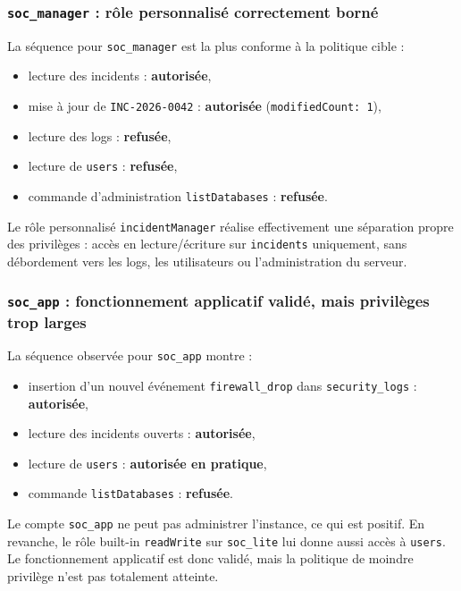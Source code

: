 \documentclass[11pt,a4paper]{article}
\begin{document}
\subsubsection{\texttt{soc\_manager} : rôle personnalisé correctement borné}

La séquence pour \texttt{soc\_manager} est la plus conforme à la politique cible :
\begin{itemize}
  \item lecture des incidents : \textbf{autorisée},
  \item mise à jour de \texttt{INC-2026-0042} : \textbf{autorisée} (\texttt{modifiedCount: 1}),
  \item lecture des logs : \textbf{refusée},
  \item lecture de \texttt{users} : \textbf{refusée},
  \item commande d'administration \texttt{listDatabases} : \textbf{refusée}.
\end{itemize}

\begin{resultbox}[Évaluation]
Le rôle personnalisé \texttt{incidentManager} réalise effectivement une séparation propre des privilèges : accès en lecture/écriture sur \texttt{incidents} uniquement, sans débordement vers les logs, les utilisateurs ou l'administration du serveur.
\end{resultbox}

\subsubsection{\texttt{soc\_app} : fonctionnement applicatif validé, mais privilèges trop larges}

La séquence observée pour \texttt{soc\_app} montre :
\begin{itemize}
  \item insertion d'un nouvel événement \texttt{firewall\_drop} dans \texttt{security\_logs} : \textbf{autorisée},
  \item lecture des incidents ouverts : \textbf{autorisée},
  \item lecture de \texttt{users} : \textbf{autorisée en pratique},
  \item commande \texttt{listDatabases} : \textbf{refusée}.
\end{itemize}
\newpage
\begin{warnbox}
Le compte \texttt{soc\_app} ne peut pas administrer l'instance, ce qui est positif. En revanche, le rôle built-in \texttt{readWrite} sur \texttt{soc\_lite} lui donne aussi accès à \texttt{users}. Le fonctionnement applicatif est donc validé, mais la politique de moindre privilège n'est pas totalement atteinte.
\end{warnbox}
\end{document}
